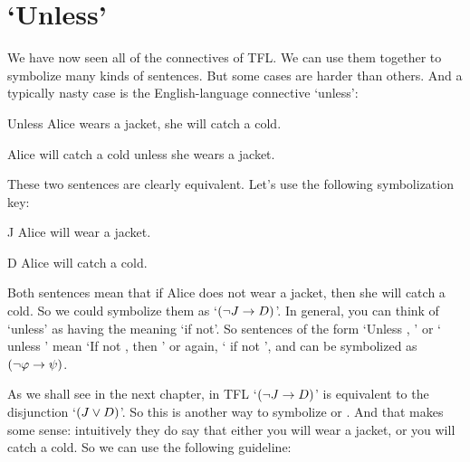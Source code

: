 

\section{`Unless'}
We have now seen all of the connectives of TFL. We can use them together to symbolize many kinds of sentences. But some cases are harder than others. And a typically nasty case is the English-language connective `unless':
\begin{earg}
\item[\ex{unless1}] Unless Alice wears a jacket, she will catch a cold.
\item[\ex{unless2}] Alice will catch a cold unless she wears a jacket.
\end{earg}
These two sentences are clearly equivalent. Let's use the following symbolization key:
	\begin{ekey}
		\item[J] Alice will wear a jacket.
		\item[D] Alice will catch a cold.
	\end{ekey}
Both sentences mean that if Alice does not wear a jacket, then she will catch a cold. So we could symbolize them as `$(\neg J \rightarrow D)$'.   In general, you can think of `unless' as having the meaning `if not'.  So sentences of the form `Unless \meta{\varphi}, \meta{\psi}' or `\meta{\psi} unless \meta{\varphi}' mean `If not \meta{\varphi}, then \meta{\psi}' or again, `\meta{\psi} if not \meta{\varphi}', and can be symbolized as $(\neg \mathcal{\varphi} \rightarrow \mathcal{\psi})$.


As we shall see in the next chapter, in TFL `$(\neg J \rightarrow D)$' is equivalent to the disjunction `$(J \vee D)$'.  So this is another way to symbolize  or .  And that makes some sense: intuitively they do say that either you will wear a jacket, or you will catch a cold.  So we can use the following guideline:

